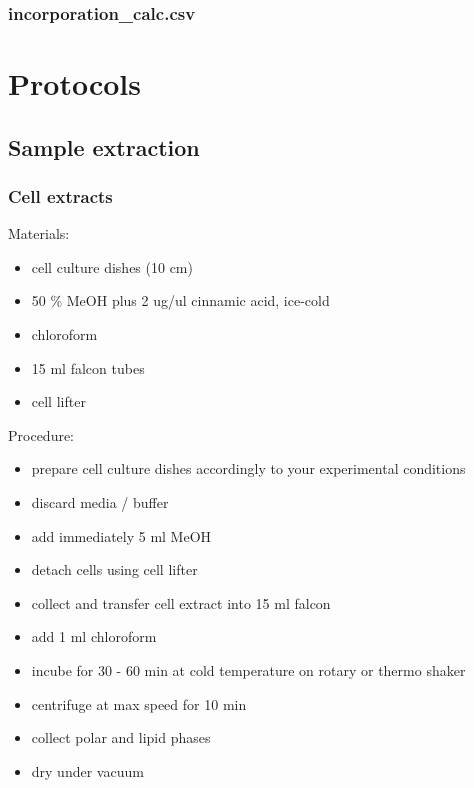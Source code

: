 \documentclass[]{book}
\providecommand{\tightlist}{%
  \setlength{\itemsep}{0pt}\setlength{\parskip}{0pt}}
\theoremstyle{definition}
\theoremstyle{definition}
\theoremstyle{definition}
\theoremstyle{remark}
\begin{document}
\subsection{incorporation\_calc.csv}\label{incorporation_calc.csv}

\chapter{Protocols}\label{protocols}

\section{Sample extraction}\label{sample-extraction}

\subsection{Cell extracts}\label{cell-extracts}

Materials:

\begin{itemize}
\tightlist
\item
  cell culture dishes (10 cm)
\item
  50 \% MeOH plus 2 ug/ul cinnamic acid, ice-cold
\item
  chloroform
\item
  15 ml falcon tubes
\item
  cell lifter
\end{itemize}

Procedure:

\begin{itemize}
\tightlist
\item
  prepare cell culture dishes accordingly to your experimental
  conditions
\item
  discard media / buffer
\item
  add immediately 5 ml MeOH
\item
  detach cells using cell lifter
\item
  collect and transfer cell extract into 15 ml falcon
\item
  add 1 ml chloroform
\item
  incube for 30 - 60 min at cold temperature on rotary or thermo shaker
\item
  centrifuge at max speed for 10 min
\item
  collect polar and lipid phases
\item
  dry under vacuum
\end{itemize}
\end{document}
